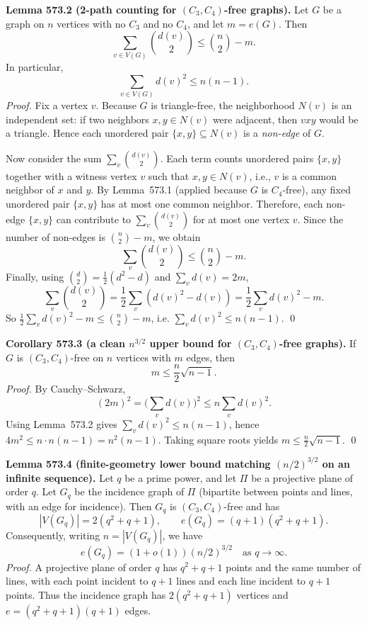 \medskip
\textbf{Lemma 573.2 (2-path counting for $(C_3,C_4)$-free graphs).}
Let $G$ be a graph on $n$ vertices with no $C_3$ and no $C_4$, and let $m=e(G)$. Then
\[
\sum_{v\in V(G)} \binom{d(v)}{2}\le \binom{n}{2}-m.
\]
In particular,
\[
\sum_{v\in V(G)} d(v)^2 \le n(n-1).
\]
\emph{Proof.}
Fix a vertex $v$. Because $G$ is triangle-free, the neighborhood $N(v)$ is an independent set: if two neighbors $x,y\in N(v)$ were adjacent, then $vxy$ would be a triangle.
Hence each unordered pair $\{x,y\}\subseteq N(v)$ is a \emph{non-edge} of $G$.

Now consider the sum $\sum_v \binom{d(v)}{2}$. Each term counts unordered pairs $\{x,y\}$ together with a witness vertex $v$ such that $x,y\in N(v)$, i.e., $v$ is a common neighbor of $x$ and $y$.
By Lemma~573.1 (applied because $G$ is $C_4$-free), any fixed unordered pair $\{x,y\}$ has at most one common neighbor. Therefore, each non-edge $\{x,y\}$ can contribute to $\sum_v \binom{d(v)}{2}$ for at most one vertex $v$.
Since the number of non-edges is $\binom{n}{2}-m$, we obtain
\[
\sum_{v} \binom{d(v)}{2} \le \binom{n}{2}-m.
\]
Finally, using $\binom{d}{2}=\tfrac12(d^2-d)$ and $\sum_v d(v)=2m$,
\[
\sum_v \binom{d(v)}{2}=\frac12\sum_v(d(v)^2-d(v))=\frac12\sum_v d(v)^2 - m.
\]
So $\frac12\sum_v d(v)^2 - m \le \binom{n}{2}-m$, i.e.
$\sum_v d(v)^2\le n(n-1)$.
\qed

\medskip
\textbf{Corollary 573.3 (a clean $n^{3/2}$ upper bound for $(C_3,C_4)$-free graphs).}
If $G$ is $(C_3,C_4)$-free on $n$ vertices with $m$ edges, then
\[
m\le \frac{n}{2}\sqrt{n-1}.
\]
\emph{Proof.}
By Cauchy--Schwarz,
\[
(2m)^2=\Big(\sum_v d(v)\Big)^2 \le n\sum_v d(v)^2.
\]
Using Lemma~573.2 gives $\sum_v d(v)^2\le n(n-1)$, hence
$4m^2\le n\cdot n(n-1)=n^2(n-1)$.
Taking square roots yields $m\le \tfrac{n}{2}\sqrt{n-1}$.
\qed

\medskip
\textbf{Lemma 573.4 (finite-geometry lower bound matching $(n/2)^{3/2}$ on an infinite sequence).}
Let $q$ be a prime power, and let $\Pi$ be a projective plane of order $q$.
Let $G_q$ be the incidence graph of $\Pi$ (bipartite between points and lines, with an edge for incidence).
Then $G_q$ is $(C_3,C_4)$-free and has
\[
|V(G_q)|=2(q^2+q+1),\qquad e(G_q)=(q+1)(q^2+q+1).
\]
Consequently, writing $n=|V(G_q)|$, we have
\[
 e(G_q)=(1+o(1))(n/2)^{3/2} \quad\text{as }q\to\infty.
\]
\emph{Proof.}
A projective plane of order $q$ has $q^2+q+1$ points and the same number of lines, with each point incident to $q+1$ lines and each line incident to $q+1$ points.
Thus the incidence graph has $2(q^2+q+1)$ vertices and
$e=(q^2+q+1)(q+1)$ edges.

